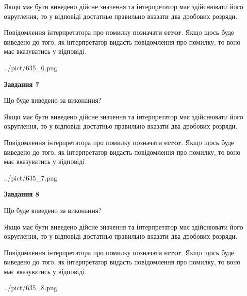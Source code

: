 \documentclass[12pt, ukrainian]{article}
\begin{document}
{\begin {Large}
Якщо має бути виведено дійсне значення та інтерпретатор має здійснювати його округлення, 
то у відповіді достатньо правильно вказати два дробових розряди.

Повідомлення інтерпретатора про помилку позначати \textbf{error}.
Якщо щось буде виведено до того, як інтерпретатор видасть повідомлення про помилку, 
то воно має вказуватись у відповіді. \par

\begin{center}
	{../pict/635_6.png}
\end{center}
\newpage

{\begin {center}\textbf{Завдання 7}\end {center}}\par
Що буде виведено за виконання? \par

Якщо має бути виведено дійсне значення та інтерпретатор має здійснювати його округлення, 
то у відповіді достатньо правильно вказати два дробових розряди.

Повідомлення інтерпретатора про помилку позначати \textbf{error}.
Якщо щось буде виведено до того, як інтерпретатор видасть повідомлення про помилку, 
то воно має вказуватись у відповіді. \par

\begin{center}
	{../pict/635_7.png}
\end{center}
\newpage

{\begin {center}\textbf{Завдання 8}\end {center}}\par
Що буде виведено за виконання? \par

Якщо має бути виведено дійсне значення та інтерпретатор має здійснювати його округлення, 
то у відповіді достатньо правильно вказати два дробових розряди.

Повідомлення інтерпретатора про помилку позначати \textbf{error}.
Якщо щось буде виведено до того, як інтерпретатор видасть повідомлення про помилку, 
то воно має вказуватись у відповіді. \par

\begin{center}
	{../pict/635_8.png}
\end{center}
\newpage


\end{Large}}
\end{document}
